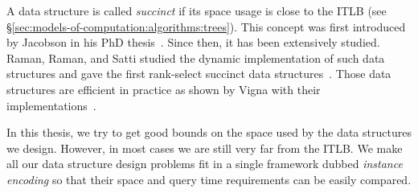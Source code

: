 A data structure is called \emph{succinct} if its space usage is close to the
ITLB (see \S\ref{sec:models-of-computation:algorithms:trees}).
%
This concept was first introduced by Jacobson in his PhD thesis~\cite{Ja88}.
%
Since then, it has been extensively studied.
%
Raman, Raman, and Satti studied the dynamic implementation of such data
structures and gave the first rank-select succinct
data structures~\cite{RRS01,RRS07}.
%
%
Those data structures are efficient in practice as shown by Vigna with
their implementations~\cite{Vi08}.

In this thesis, we try to get good bounds on the space used by the data
structures we design. However, in most cases we are still very far from the
ITLB. We make all our data structure design problems fit in a single framework
dubbed \emph{instance encoding} so that their space and query time
requirements can be easily compared.
%



